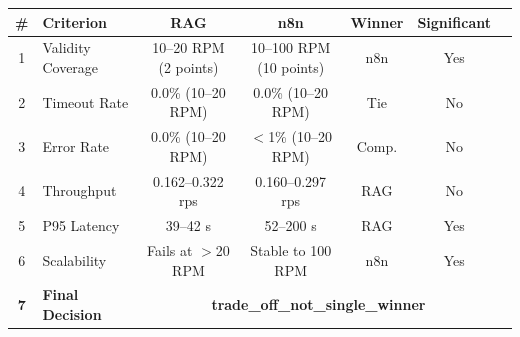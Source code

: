 \begin{tabular}{clccccl}
\toprule
\textbf{\#} & \textbf{Criterion} & \textbf{RAG} & \textbf{n8n} & \textbf{Winner} & \textbf{Significant} \\
\midrule
1 & Validity Coverage & 10--20 RPM (2 points) & 10--100 RPM (10 points) & \cellcolor{n8nwinner}n8n & Yes \\
2 & Timeout Rate & 0.0\% (10--20 RPM) & 0.0\% (10--20 RPM) & \cellcolor{tiecolor}Tie & No \\
3 & Error Rate & 0.0\% (10--20 RPM) & $<$1\% (10--20 RPM) & \cellcolor{tiecolor}Comp. & No \\
4 & Throughput & 0.162--0.322 rps & 0.160--0.297 rps & \cellcolor{ragwinner}RAG & No \\
5 & P95 Latency & 39--42 s & 52--200 s & \cellcolor{ragwinner}RAG & Yes \\
6 & Scalability & Fails at $>$20 RPM & Stable to 100 RPM & \cellcolor{n8nwinner}n8n & Yes \\
\midrule
\textbf{7} & \textbf{Final Decision} & \multicolumn{4}{c}{\cellcolor{finaldecision}\textbf{trade\_off\_not\_single\_winner}} \\
\bottomrule
\end{tabular}